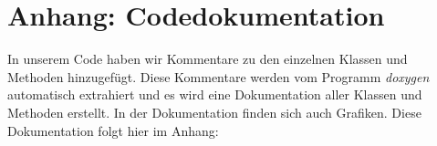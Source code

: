 \documentclass[12pt,a4paper]{scrartcl}
\begin{document}
\clearpage
\newpage

\section*{Anhang: Codedokumentation}
In unserem Code haben wir Kommentare zu den einzelnen Klassen und Methoden hinzugefügt.
Diese Kommentare werden vom Programm \textit{doxygen} automatisch extrahiert und es wird eine
Dokumentation aller Klassen und Methoden erstellt. In der Dokumentation finden sich auch
Grafiken. Diese Dokumentation folgt hier im Anhang:\\

%
\end{document}
